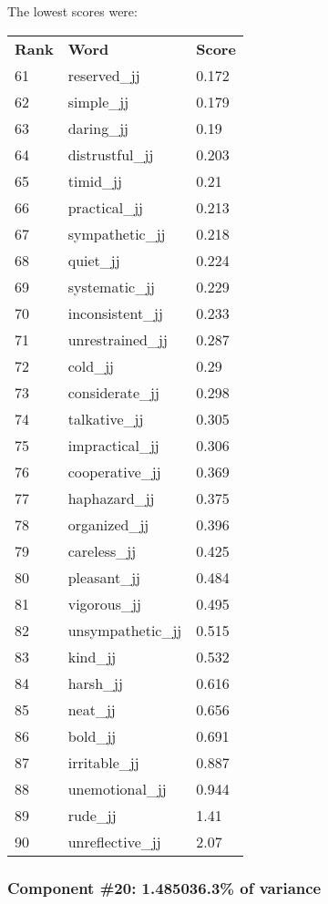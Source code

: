 \documentclass[10pt,letterpaper]{book}
\begin{document}
The lowest scores were:
\begin{tabular}{ l l l }
        \textbf{Rank} & \textbf{Word} & \textbf{Score} \\
        61 & reserved\_jj & 0.172 \\
        62 & simple\_jj & 0.179 \\
        63 & daring\_jj & 0.19 \\
        64 & distrustful\_jj & 0.203 \\
        65 & timid\_jj & 0.21 \\
        66 & practical\_jj & 0.213 \\
        67 & sympathetic\_jj & 0.218 \\
        68 & quiet\_jj & 0.224 \\
        69 & systematic\_jj & 0.229 \\
        70 & inconsistent\_jj & 0.233 \\
        71 & unrestrained\_jj & 0.287 \\
        72 & cold\_jj & 0.29 \\
        73 & considerate\_jj & 0.298 \\
        74 & talkative\_jj & 0.305 \\
        75 & impractical\_jj & 0.306 \\
        76 & cooperative\_jj & 0.369 \\
        77 & haphazard\_jj & 0.375 \\
        78 & organized\_jj & 0.396 \\
        79 & careless\_jj & 0.425 \\
        80 & pleasant\_jj & 0.484 \\
        81 & vigorous\_jj & 0.495 \\
        82 & unsympathetic\_jj & 0.515 \\
        83 & kind\_jj & 0.532 \\
        84 & harsh\_jj & 0.616 \\
        85 & neat\_jj & 0.656 \\
        86 & bold\_jj & 0.691 \\
        87 & irritable\_jj & 0.887 \\
        88 & unemotional\_jj & 0.944 \\
        89 & rude\_jj & 1.41 \\
        90 & unreflective\_jj & 2.07 \\
\end{tabular}
\subsubsection{Component \#20: 1.485036.3\% of variance}
\end{document}
